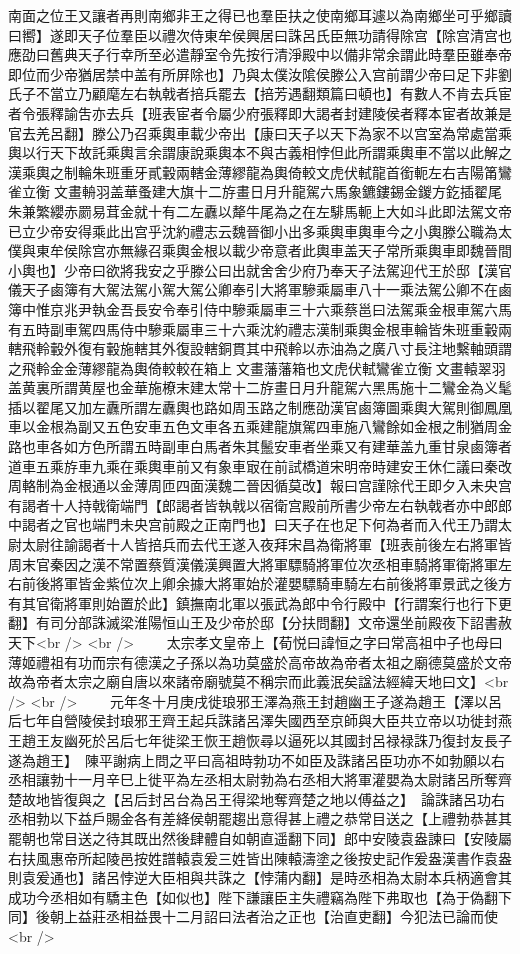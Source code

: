 南面之位王又讓者再則南鄉非王之得已也羣臣扶之使南鄉耳遽以為南鄉坐可乎鄉讀曰嚮】遂即天子位羣臣以禮次侍東牟侯興居曰誅呂氏臣無功請得除宫【除宫清宫也應劭曰舊典天子行幸所至必遣靜室令先按行清淨殿中以備非常余謂此時羣臣雖奉帝即位而少帝猶居禁中盖有所屏除也】乃與太僕汝隂侯滕公入宫前謂少帝曰足下非劉氏子不當立乃顧麾左右執戟者掊兵罷去【掊芳遇翻類篇曰頓也】有數人不肯去兵宦者令張釋諭吿亦去兵【班表宦者令屬少府張釋即大謁者封建陵侯者釋本宦者故兼是官去羌呂翻】滕公乃召乘輿車載少帝出【康曰天子以天下為家不以宫室為常處當乘輿以行天下故託乘輿言余謂康說乘輿本不與古義相悖但此所謂乘輿車不當以此解之漢乘輿之制輪朱班重牙貳轂兩轄金薄繆龍為輿倚較文虎伏軾龍首銜軛左右吉陽筩鸞雀立衡文畫輈羽盖華蚤建大旗十二斿畫日月升龍駕六馬象鑣鏤錫金鍐方釳插翟尾朱兼繁纓赤罽易茸金就十有二左纛以犛牛尾為之在左騑馬軛上大如斗此即法駕文帝已立少帝安得乘此出宫乎沈約禮志云魏晉御小出多乘輿車輿車今之小輿滕公職為太僕與東牟侯除宫亦無緣召乘輿金根以載少帝意者此輿車盖天子常所乘輿車即魏晉間小輿也】少帝曰欲將我安之乎滕公曰出就舍舍少府乃奉天子法駕迎代王於邸【漢官儀天子鹵簿有大駕法駕小駕大駕公卿奉引大將軍驂乘屬車八十一乘法駕公卿不在鹵簿中惟京兆尹執金吾長安令奉引侍中驂乘屬車三十六乘蔡邕曰法駕乘金根車駕六馬有五時副車駕四馬侍中驂乘屬車三十六乘沈約禮志漢制乘輿金根車輪皆朱班重轂兩轄飛軨轂外復有轂施轄其外復設轄銅貫其中飛軨以赤油為之廣八寸長注地繫軸頭謂之飛軨金金薄繆龍為輿倚較較在箱上文畫藩藩箱也文虎伏軾鸞雀立衡文畫轅翠羽盖黄裏所謂黄屋也金華施橑末建太常十二斿畫日月升龍駕六黑馬施十二鸞金為义髦插以翟尾又加左纛所謂左纛輿也路如周玉路之制應劭漢官鹵簿圖乘輿大駕則御鳳凰車以金根為副又五色安車五色文車各五乘建龍旗駕四車施八鸞餘如金根之制猶周金路也車各如方色所謂五時副車白馬者朱其鬛安車者坐乘又有建華盖九重甘泉鹵簿者道車五乘斿車九乘在乘輿車前又有象車㝡在前試橋道宋明帝時建安王休仁議曰秦改周輅制為金根通以金薄周匝四面漢魏二晉因循莫改】報曰宫謹除代王即夕入未央宫有謁者十人持戟衛端門【郎謁者皆執戟以宿衛宫殿前所書少帝左右執戟者亦中郎郎中謁者之官也端門未央宫前殿之正南門也】曰天子在也足下何為者而入代王乃謂太尉太尉往諭謁者十人皆掊兵而去代王遂入夜拜宋昌為衛將軍【班表前後左右將軍皆周末官秦因之漢不常置蔡質漢儀漢興置大將軍驃騎將軍位次丞相車騎將軍衛將軍左右前後將軍皆金紫位次上卿余據大將軍始於灌嬰驃騎車騎左右前後將軍景武之後方有其官衛將軍則始置於此】鎮撫南北軍以張武為郎中令行殿中【行謂案行也行下更翻】有司分部誅滅梁淮陽恒山王及少帝於邸【分扶問翻】文帝還坐前殿夜下詔書赦天下<br />
<br />
　　太宗孝文皇帝上【荀悦曰諱恒之字曰常高祖中子也母曰薄姬禮祖有功而宗有德漢之子孫以為功莫盛於高帝故為帝者太祖之廟德莫盛於文帝故為帝者太宗之廟自唐以來諸帝廟號莫不稱宗而此義泯矣諡法經緯天地曰文】<br />
<br />
　　元年冬十月庚戌徙琅邪王澤為燕王封趙幽王子遂為趙王【澤以呂后七年自營陵侯封琅邪王齊王起兵誅諸呂澤失國西至京師與大臣共立帝以功徙封燕王趙王友幽死於呂后七年徙梁王恢王趙恢尋以逼死以其國封呂禄禄誅乃復封友長子遂為趙王】　陳平謝病上問之平曰高祖時勃功不如臣及誅諸呂臣功亦不如勃願以右丞相讓勃十一月辛巳上徙平為左丞相太尉勃為右丞相大將軍灌嬰為太尉諸呂所奪齊楚故地皆復與之【呂后封呂台為呂王得梁地奪齊楚之地以傅益之】　論誅諸呂功右丞相勃以下益戶賜金各有差絳侯朝罷趨出意得甚上禮之恭常目送之【上禮勃恭甚其罷朝也常目送之待其既出然後肆體自如朝直遥翻下同】郎中安陵袁盎諫曰【安陵屬右扶風惠帝所起陵邑按姓譜轅袁爰三姓皆出陳轅濤塗之後按史記作爰盎漢書作袁盎則袁爰通也】諸呂悖逆大臣相與共誅之【悖蒲内翻】是時丞相為太尉本兵柄適會其成功今丞相如有驕主色【如似也】陛下謙讓臣主失禮竊為陛下弗取也【為于偽翻下同】後朝上益莊丞相益畏十二月詔曰法者治之正也【治直吏翻】今犯法已論而使<br />

